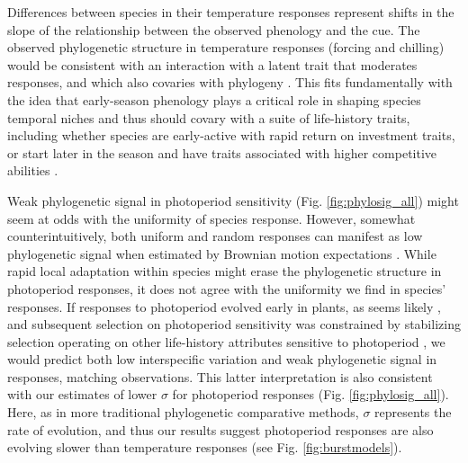 \documentclass[11pt]{article}
\begin{document}
Differences between species in their temperature responses represent shifts in the slope of the relationship between the observed phenology and the cue. The observed phylogenetic structure in temperature responses (forcing and chilling) would be consistent with an interaction with a latent trait that moderates responses, and which also covaries with phylogeny \citep{davies2019phylogenetically}. This fits fundamentally with the idea that early-season phenology plays a critical role in shaping species temporal niches \citep{gotelli1996} and thus should covary with a suite of life-history traits, including whether species are early-active with rapid return on investment traits, or start later in the season and have traits associated with higher competitive abilities \citep[e.g.,][]{Grime:1977sw,wolkovich2014aob}. 


Weak phylogenetic signal in photoperiod sensitivity (Fig. \ref{fig:phylosig_all}) might seem at odds with the uniformity of species response. However, somewhat counterintuitively, both uniform and random responses can manifest as low phylogenetic signal when estimated by Brownian motion expectations \citep{wiens2010niche}. While rapid local adaptation within species might erase the phylogenetic structure in photoperiod responses, it does not agree with the uniformity we find in species' responses. If responses to photoperiod evolved early in plants, as seems likely \citep{serrano2017}, and subsequent selection on photoperiod sensitivity was constrained by stabilizing selection operating on other life-history attributes sensitive to photoperiod \citep[e.g.,][]{Rinne:1994,Wilczek2014,azeez2015}, we would predict both low interspecific variation and weak phylogenetic signal in responses, matching observations. This latter interpretation is also consistent with our estimates of lower $\sigma$ for photoperiod responses (Fig. \ref{fig:phylosig_all}). Here, as in more traditional phylogenetic comparative methods, $\sigma$ represents the rate of evolution, and thus our results suggest photoperiod responses are also evolving slower than temperature responses (see Fig. \ref{fig:burstmodels}).
\end{document}
